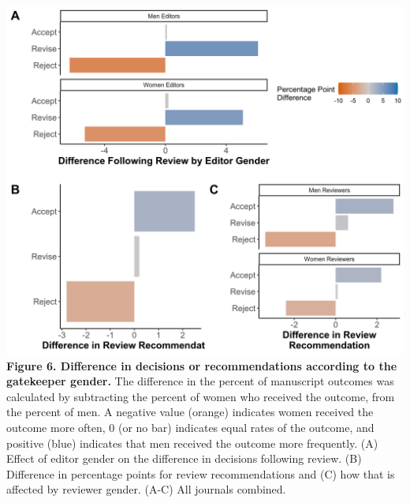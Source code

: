 \documentclass[11pt,]{article}
\begin{document}
\includegraphics{Figure_6.png} \textbf{Figure 6. Difference in decisions
or recommendations according to the gatekeeper gender.} The difference
in the percent of manuscript outcomes was calculated by subtracting the
percent of women who received the outcome, from the percent of men. A
negative value (orange) indicates women received the outcome more often,
0 (or no bar) indicates equal rates of the outcome, and positive (blue)
indicates that men received the outcome more frequently. (A) Effect of
editor gender on the difference in decisions following review. (B)
Difference in percentage points for review recommendations and (C) how
that is affected by reviewer gender. (A-C) All journals combined.

\newpage
\end{document}
